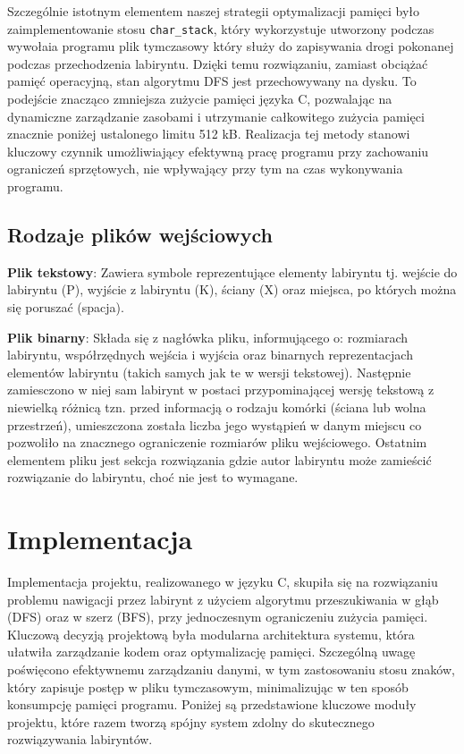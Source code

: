 \documentclass{article}
\begin{document}
\vspace{5mm}

Szczególnie istotnym elementem naszej strategii optymalizacji pamięci było zaimplementowanie stosu \texttt{char\_stack}, który wykorzystuje utworzony podczas wywołaia programu plik tymczasowy który służy do zapisywania drogi pokonanej podczas przechodzenia labiryntu. Dzięki temu rozwiązaniu, zamiast obciążać pamięć operacyjną, stan algorytmu DFS jest przechowywany na dysku. To podejście znacząco zmniejsza zużycie pamięci języka C, pozwalając na dynamiczne zarządzanie zasobami i utrzymanie całkowitego zużycia pamięci znacznie poniżej ustalonego limitu 512 kB. Realizacja tej metody stanowi kluczowy czynnik umożliwiający efektywną pracę programu przy zachowaniu ograniczeń sprzętowych, nie wpływający przy tym na czas wykonywania programu.

\subsection{Rodzaje plików wejściowych}

\item \textbf{Plik tekstowy}: Zawiera symbole reprezentujące elementy labiryntu tj. wejście do labiryntu (P), wyjście z labiryntu (K), ściany (X) oraz miejsca, po których można się poruszać (spacja).

\item \textbf{Plik binarny}: Składa się z nagłówka pliku, informującego o: rozmiarach labiryntu, współrzędnych wejścia i wyjścia oraz binarnych reprezentacjach elementów labiryntu (takich samych jak te w wersji tekstowej). Następnie zamiesczono w niej sam labirynt w postaci przypominającej wersję tekstową z niewielką różnicą tzn. przed informacją o rodzaju komórki (ściana lub wolna przestrzeń), umieszczona została liczba jego wystąpień w danym miejscu co pozwoliło na znacznego ograniczenie rozmiarów pliku wejściowego. Ostatnim elementem pliku jest sekcja rozwiązania gdzie autor labiryntu może zamieścić rozwiązanie do labiryntu, choć nie jest to wymagane.


\section{Implementacja}


Implementacja projektu, realizowanego w języku C, skupiła się na rozwiązaniu problemu nawigacji przez labirynt z użyciem algorytmu przeszukiwania w głąb (DFS) oraz w szerz (BFS), przy jednoczesnym ograniczeniu zużycia pamięci. Kluczową decyzją projektową była modularna architektura systemu, która ułatwiła zarządzanie kodem oraz optymalizację pamięci. Szczególną uwagę poświęcono efektywnemu zarządzaniu danymi, w tym zastosowaniu stosu znaków, który zapisuje postęp w pliku tymczasowym, minimalizując w ten sposób konsumpcję pamięci programu. Poniżej są przedstawione kluczowe moduły projektu, które razem tworzą spójny system zdolny do skutecznego rozwiązywania labiryntów.
\end{document}

